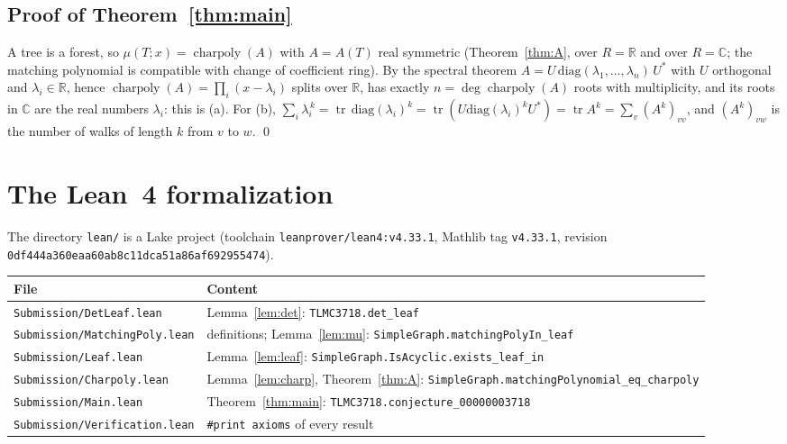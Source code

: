 \documentclass[11pt,a4paper]{article}
\theoremstyle{definition}
\theoremstyle{remark}
\newcommand{\R}{\mathbb{R}}
\newcommand{\C}{\mathbb{C}}
\DeclareMathOperator{\tr}{tr}
\DeclareMathOperator{\charp}{charpoly}
\begin{document}
\subsection{Proof of Theorem~\ref{thm:main}}
A tree is a forest, so $\mu(T;x)=\charp(A)$ with $A=A(T)$ real symmetric
(Theorem~\ref{thm:A}, over $R=\R$ and over $R=\C$; the matching polynomial is compatible with
change of coefficient ring). By the spectral theorem $A=U\,\mathrm{diag}(\lambda_1,\dots,\lambda_n)\,U^{*}$
with $U$ orthogonal and $\lambda_i\in\R$, hence $\charp(A)=\prod_i(x-\lambda_i)$ splits over $\R$,
has exactly $n=\deg\charp(A)$ roots with multiplicity, and its roots in $\C$ are the real numbers
$\lambda_i$: this is (a). For (b), $\sum_i\lambda_i^{\,k}=\tr\,\mathrm{diag}(\lambda_i)^k
=\tr(U\mathrm{diag}(\lambda_i)^kU^{*})=\tr A^k=\sum_v (A^k)_{vv}$, and $(A^k)_{vw}$ is the
number of walks of length $k$ from $v$ to $w$. \qed

\section{The Lean~4 formalization}

The directory \texttt{lean/} is a Lake project (toolchain \texttt{leanprover/lean4:v4.33.1},
Mathlib tag \texttt{v4.33.1}, revision \texttt{0df444a360eaa60ab8c11dca51a86af692955474}).
\begin{center}\small
\begin{tabular}{@{}ll@{}}
\toprule
File & Content\\
\midrule
\texttt{Submission/DetLeaf.lean} & Lemma~\ref{lem:det}: \texttt{TLMC3718.det\_leaf}\\
\texttt{Submission/MatchingPoly.lean} & definitions; Lemma~\ref{lem:mu}: \texttt{SimpleGraph.matchingPolyIn\_leaf}\\
\texttt{Submission/Leaf.lean} & Lemma~\ref{lem:leaf}: \texttt{SimpleGraph.IsAcyclic.exists\_leaf\_in}\\
\texttt{Submission/Charpoly.lean} & Lemma~\ref{lem:charp}, Theorem~\ref{thm:A}: \texttt{SimpleGraph.matchingPolynomial\_eq\_charpoly}\\
\texttt{Submission/Main.lean} & Theorem~\ref{thm:main}: \texttt{TLMC3718.conjecture\_00000003718}\\
\texttt{Submission/Verification.lean} & \texttt{\#print axioms} of every result\\
\bottomrule
\end{tabular}
\end{center}
\end{document}
